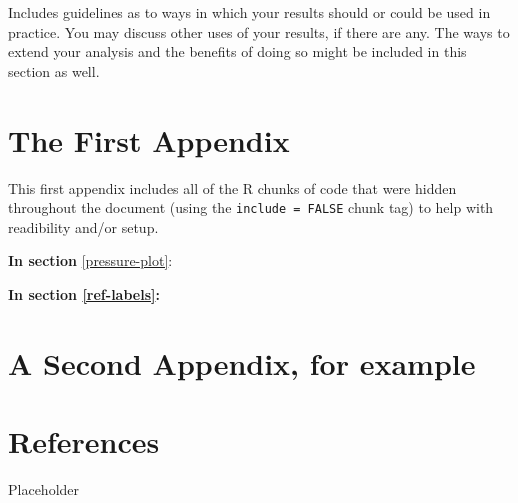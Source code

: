 \documentclass[12pt,oneside]{chicagocapstone}
\begin{document}
Includes guidelines as to ways in which your results should or could be used in practice. You may discuss other uses of your results, if there are any. The ways to extend your analysis and the benefits of doing so might be included in this section as well.

\appendix

\hypertarget{the-first-appendix}{%
\chapter{The First Appendix}\label{the-first-appendix}}

This first appendix includes all of the R chunks of code that were hidden throughout the document (using the \texttt{include\ =\ FALSE} chunk tag) to help with readibility and/or setup.

\textbf{In section} \ref{pressure-plot}:

\textbf{In section \ref{ref-labels}:}

\hypertarget{a-second-appendix-for-example}{%
\chapter{A Second Appendix, for example}\label{a-second-appendix-for-example}}

\hypertarget{references}{%
\chapter*{References}\label{references}}

Placeholder


\end{document}
